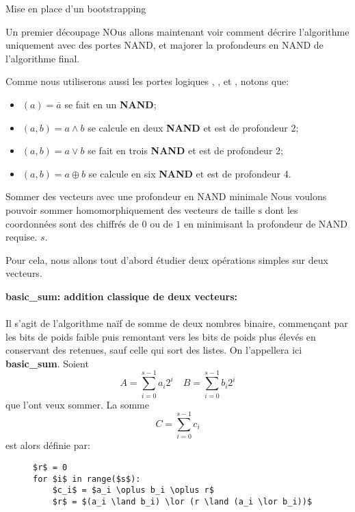 \begin{section}{Mise en place d'un bootstrapping}
\begin{subsection}{Un premier découpage}
NOus allons maintenant voir comment décrire l'algorithme uniquement avec des
portes NAND, et majorer la profondeurs en NAND de l'algorithme final.

Comme nous utiliserons aussi les portes logiques , ,
 et , notons que:
\begin{itemize}
\item {}$(a) = \overline{a}$ se fait en un \textbf{NAND};
\item {}$(a, b) = a \land b$ se calcule en deux \textbf{NAND} et est de
	profondeur 2;
\item {}$(a, b) = a \lor b$ se fait en trois \textbf{NAND} et est de
	profondeur 2;
\item {}$(a, b) = a \oplus b$ se calcule en six \textbf{NAND} et est de
	profondeur 4.
\end{itemize}
\end{subsection}
\begin{subsection}{Sommer des vecteurs avec une profondeur en NAND minimale}
Nous voulons pouvoir sommer homomorphiquement des vecteurs de taille
$\text{s}$ dont les coordonnées
sont des chiffrés de $0$ ou de $1$ en minimisant la profondeur de NAND requise. 
$s$.

Pour cela, nous allons tout d'abord étudier deux opérations simples sur deux vecteurs.


\vspace{0.3cm}
\noindent
\textbf{basic\_sum: addition classique de deux vecteurs:}
\paragraph{}
Il s'agit de l'algorithme naïf de
somme de deux nombres binaire, commençant par les bits de poids faible puis
remontant vers les bits de poids plus élevés en conservant des
retenues, sauf celle qui \og sort \fg des listes. On l'appellera ici
\textbf{basic\_sum}.
Soient 
\[ A = \sum_{i=0}^{s-1} a_i 2^i \quad B = \sum_{i=0}^{s-1} b_i 2^i\]
que l'ont veux sommer. La somme \[C =\sum_{i=0}^{s-1} c_i\]
est alors définie par:
	
\begin{figure}[!h]
\begin{lstlisting}
$r$ = 0
for $i$ in range($s$):
	$c_i$ = $a_i \oplus b_i \oplus r$
	$r$ = $(a_i \land b_i) \lor (r \land (a_i \lor b_i))$
\end{lstlisting}
\end{figure}


\end{subsection}
\end{section}
